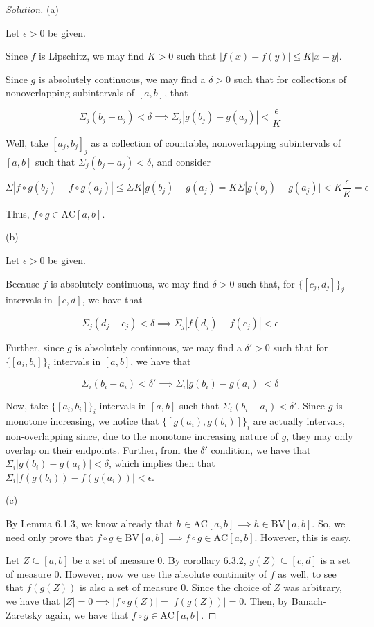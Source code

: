 \documentclass[10pt]{article}
\newcommand{\bv}{{\text{BV}}}
\newcommand{\ac}{{\text{AC}}}
\begin{document}
\begin{proof}[Solution]

(a)

Let $\epsilon > 0$ be given. 

Since $f$ is Lipschitz, we may find $K > 0$ such that $| f(x) - f(y) | \leq K | x - y | $.

Since $g$ is absolutely continuous, we may find a $\delta > 0$ such that for collections of nonoverlapping subintervals of $[a,b]$, that

$$ \Sigma_j (b_j - a_j) < \delta \implies \Sigma_j |g(b_j) - g(a_j)| < \frac{\epsilon}{K} $$

Well, take $[a_j,b_j]_j$ as a collection of countable, nonoverlapping subintervals of $[a,b]$ such that $\Sigma_j (b_j - a_j) < \delta$, and consider

$$ \Sigma | f \circ g (b_j) - f \circ g (a_j) | \leq \Sigma K |g(b_j) - g(a_j)  = K \Sigma | g(b_j) - g(a_j)| < K \frac{\epsilon}{K}  = \epsilon $$

Thus, $f \circ g \in \ac[a,b]$.

(b)

Let $\epsilon > 0$ be given.

Because $f$ is absolutely continuous, we may find $ \delta > 0$ such that, for $\{ [c_j,d_j] \}_j$ intervals in $[c,d]$, we have that

$$ \Sigma_j (d_j - c_j) < \delta \implies \Sigma_j |f(d_j) - f(c_j)| < \epsilon $$

Further, since $g$ is absolutely continuous, we may find a $\delta' > 0$ such that for $\{ [a_i, b_i] \}_i$ intervals in $[a,b]$, we have that

$$ \Sigma_i (b_i - a_i) < \delta' \implies \Sigma_i |g(b_i) - g(a_i)| < \delta $$

Now, take $\{ [a_i, b_i] \}_i$ intervals in $[a,b]$ such that $ \Sigma_i (b_i - a_i) < \delta'$. Since $g$ is monotone increasing, we notice that $\{ [g(a_i), g(b_i)] \}_i$ are actually intervals, non-overlapping since, due to the monotone increasing nature of $g$, they may only overlap on their endpoints. Further, from the $\delta'$ condition, we have that $\Sigma_i |g(b_i) - g(a_i)| < \delta$, which implies then that $\Sigma_i |f(g(b_i)) - f(g(a_i)) | < \epsilon$.

(c)

By Lemma 6.1.3, we know already that $h \in \ac[a,b] \implies h \in \bv[a,b]$. So, we need only prove that $f \circ g \in \bv[a,b] \implies f \circ g \in \ac[a,b]$. However, this is easy.

Let $Z \subseteq [a,b]$ be a set of measure 0. By corollary 6.3.2, $g(Z) \subseteq [c,d]$ is a set of measure 0. However, now we use the absolute continuity of $f$ as well, to see that $f(g(Z))$ is also a set of measure 0. Since the choice of $Z$ was arbitrary, we have that $|Z| = 0 \implies |f \circ g(Z)| = |f(g(Z))| = 0$. Then, by Banach-Zaretsky again, we have that $f \circ g \in \ac[a,b]$.


\end{proof}
\end{document}
